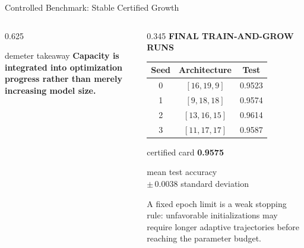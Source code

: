 \begin{frame}[t]{Controlled Benchmark: Stable Certified Growth}
\begin{columns}[T,onlytextwidth]
\begin{column}{0.625\textwidth}
      \vspace{0.05cm}
      \begin{beamercolorbox}[rounded=true,sep=0.09cm,wd=\linewidth]{demeter takeaway}
        {\fontsize{6.9}{8.2}\selectfont\bfseries
        Capacity is integrated into optimization progress rather than merely
        increasing model size.}
      \end{beamercolorbox}
    \end{column}

    \begin{column}{0.345\textwidth}
      {\color{EnstaBlue}\bfseries\scriptsize FINAL TRAIN-AND-GROW RUNS}
      \vspace{0.04cm}

      {\centering
      \fontsize{6.7}{8.0}\selectfont
      \setlength{\tabcolsep}{3.2pt}
      \renewcommand{\arraystretch}{1.30}
      \begin{tabular}{c|c|c}
        \textbf{Seed} & \textbf{Architecture} & \textbf{Test} \\
        \hline
        0 & $[16,19,9]$  & 0.9523 \\
        1 & $[9,18,18]$  & 0.9574 \\
        2 & $[13,16,15]$ & 0.9614 \\
        3 & $[11,17,17]$ & 0.9587
      \end{tabular}\par}

      \vspace{0.12cm}
      \begin{beamercolorbox}[rounded=true,sep=0.12cm,wd=\linewidth]{certified card}
        \centering
        {\color{CertifiedGreen}\fontsize{13}{15}\selectfont\bfseries
        0.9575}

        \vspace{0.01cm}
        {\fontsize{6.7}{8}\selectfont
        mean test accuracy\\
        $\pm\,0.0038$ standard deviation}
      \end{beamercolorbox}

      \vspace{0.12cm}
      {\fontsize{6.9}{8.2}\selectfont
      A fixed epoch limit is a weak stopping rule: unfavorable initializations
      may require longer adaptive trajectories before reaching the parameter
      budget.}
    \end{column}
  \end{columns}
\end{frame}
